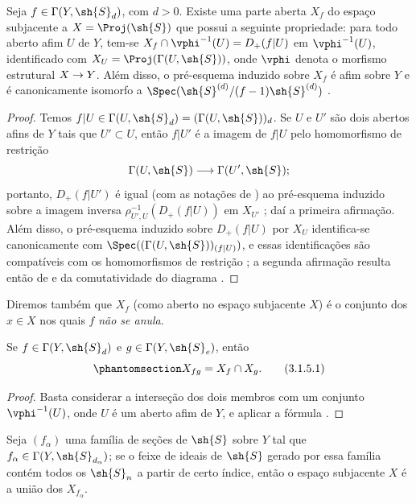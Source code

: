 \documentclass[oneside,10pt]{amsart}
\makeatletter
\newcommand{\ega@arrow}[2]{\mathchoice{#1}{#2}{#2}{#2}}
\renewcommand{\to}{\ega@arrow{\longrightarrow}{\rightarrow}}
\newcommand{\oldpage}[2][]{\marginnote{\normalfont\footnotesize\textbf{#1}~|~#2}\ignorespaces}
\let\EGAOriginalLabel\label
\renewcommand{\label}[1]{\phantomsection\EGAOriginalLabel{#1}}
\makeatother
\begin{document}
\begin{proposition}[3.1.4]
\label{II.3.1.4}
Seja $f\in\Gamma(Y,\sh{S}_d)$, com $d>0$.
Existe uma parte aberta $X_f$ do espaço subjacente a $X=\Proj(\sh{S})$ que possui a seguinte propriedade:
para todo aberto afim $U$ de $Y$,
\oldpage[II]{51}
tem-se $X_f\cap\vphi^{-1}(U)=D_+(f|U)$ em $\vphi^{-1}(U)$, identificado com $X_U=\Proj(\Gamma(U,\sh{S}))$, onde $\vphi$ denota o morfismo estrutural $X\to Y$.
Além disso, o pré-esquema induzido sobre $X_f$ é afim sobre $Y$ e é canonicamente isomorfo a $\Spec(\sh{S}^{(d)}/(f-1)\sh{S}^{(d)})$ .
\end{proposition}

\begin{proof}
Temos $f|U\in\Gamma(U,\sh{S}_d)=(\Gamma(U,\sh{S}))_d$.
Se $U$ e $U'$ são dois abertos afins de $Y$ tais que $U'\subset U$, então $f|U'$ é a imagem de $f|U$ pelo homomorfismo de restrição
\[
  \Gamma(U,\sh{S}) \to \Gamma(U',\sh{S});
\]
portanto, $D_+(f|U')$ é igual (com as notações de ) ao pré-esquema induzido sobre a imagem inversa $\rho_{U',U}^{-1}(D_+(f|U))$ em $X_{U'}$ ;
daí a primeira afirmação.
Além disso, o pré-esquema induzido sobre $D_+(f|U)$ por $X_U$ identifica-se canonicamente com $\Spec((\Gamma(U,\sh{S}))_{(f|U)})$, e essas identificações são compatíveis com os homomorfismos de restrição ;
a segunda afirmação resulta então de  e da comutatividade do diagrama .
\end{proof}

Diremos também que $X_f$ (como aberto no espaço subjacente $X$) é o conjunto dos $x\in X$ nos quais $f$ \emph{não se anula}.

\begin{corollary}[3.1.5]
\label{II.3.1.5}
Se $f\in\Gamma(Y,\sh{S}_d)$ e $g\in\Gamma(Y,\sh{S}_e)$, então
\[
\label{II.3.1.5.1}
  X_{fg}=X_f\cap X_g.
\tag{3.1.5.1}
\]
\end{corollary}

\begin{proof}
Basta considerar a interseção dos dois membros com um conjunto $\vphi^{-1}(U)$, onde $U$ é um aberto afim de $Y$, e aplicar a fórmula .
\end{proof}

\begin{corollary}[3.1.6]
\label{II.3.1.6}
Seja $(f_\alpha)$ uma família de seções de $\sh{S}$ sobre $Y$ tal que $f_\alpha\in\Gamma(Y,\sh{S}_{d_\alpha})$;
se o feixe de ideais de $\sh{S}$ gerado por essa família  contém todos os $\sh{S}_n$ a partir de certo índice, então o espaço subjacente $X$ é a união dos $X_{f_\alpha}$.
\end{corollary}
\end{document}

